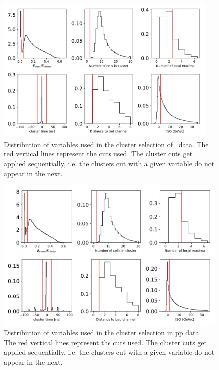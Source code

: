 \begin{figure}[h]
\center
\includegraphics[width=0.95\textwidth]{EventAndClusterSelection/ClusterCutFlow_dataset_Skimmed_13def}
\caption{Distribution of variables used in the cluster selection of \pPb~data. The red vertical lines represent the cuts used. The cluster cuts get applied sequentially, i.e. the clusters cut with a given variable do not appear in the next.}
\label{ClusterCutFlow_pPb}
\end{figure}


\begin{figure}[h]
\center
\includegraphics[width=.95\textwidth]{EventAndClusterSelection/ClusterCutFlow_dataset_Skimmed_17q}
\caption{Distribution of variables used in the cluster selection in pp data. The red vertical lines represent the cuts used. The cluster cuts get applied sequentially, i.e. the clusters cut with a given variable do not appear in the next.}
\label{ClusterCutFlow_pp}
\end{figure}


